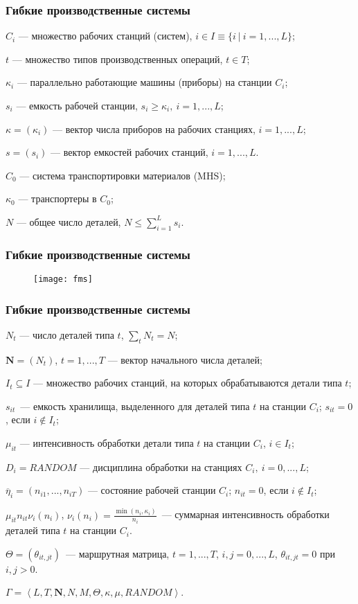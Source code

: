 
\begin{frame} \frametitle{Гибкие производственные системы}
$C_i$ --- множество рабочих станций (систем), $i \in I \equiv \{ i ~|~ i=1,...,L \}$;

$t$ --- множество типов производственных операций, $t \in T$;

$\kappa_i$ --- параллельно работающие машины (приборы) на станции $C_i$;

$s_i$ --- емкость рабочей станции, $s_i \geqslant \kappa_i, ~ i=1,...,L$;

$\kappa = (\kappa_i)$ --- вектор числа приборов на рабочих станциях, $i=1,...,L$;

$s = (s_i)$ --- вектор емкостей рабочих станций, $i=1,...,L$.

$C_0$ --- система транспортировки материалов (MHS);

$\kappa_0$ --- транспортеры в $C_0$;

$N$ --- общее число деталей, $N \leqslant \sum\limits_{i=1}^L s_i$.
\end{frame}


\begin{frame} \frametitle{Гибкие производственные системы}
\begin{figure}[H]
  \centering
  \texttt{[image: fms]}
  \label{fig:main}
\end{figure}
\end{frame}


\begin{frame} \frametitle{Гибкие производственные системы}
$N_t$ --- число деталей типа $t$, $\sum\limits_t N_t = N$;

$\mathbf{N}=(N_t)$, $t=1,...,T$ --- вектор начального числа деталей;

$I_t \subseteq I$ --- множество рабочих станций, на которых обрабатываются детали типа $t$;

$s_{it}$~--- емкость хранилища, выделенного для деталей типа $t$ на станции $C_i$; $s_{it}=0$, если $i \notin I_t$;

$\mu_{it}$ --- интенсивность обработки детали типа $t$ на станции $C_i$, $i \in I_t$;

$D_i = RANDOM$ --- дисциплина обработки на станциях $C_i,~i=0,...,L$;

$\overline{\eta}_i = (n_{i1},...,n_{iT})$ --- состояние рабочей станции $C_i$; $n_{it}=0$, если $i \notin I_t$;

$\mu_{it} n_{it} \nu_{i}(n_i)$, $\nu_i(n_i) = \frac{\min(n_i, \kappa_i)}{n_i}$~--- суммарная интенсивность обработки деталей типа $t$ на станции $C_i$.

$\Theta = (\theta_{it,jt})$~--- маршрутная матрица, $t=1,...,T$, $i,j=0,...,L$, $\theta_{it,jt}=0$ при $i,j>0$.

\center $\Gamma=\left<L,T,\mathbf{N},N,M,\Theta,\kappa,\mu,\textit{RANDOM}\right>$.
\end{frame}


